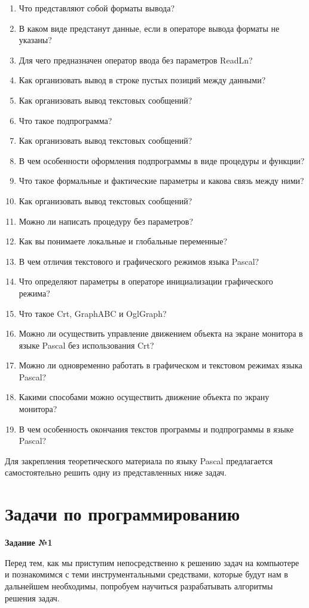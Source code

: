 \begin{enumerate}
\item Что представляют собой форматы вывода?
\item В каком виде предстанут данные, если в операторе вывода форматы не указаны?
\item Для чего предназначен оператор ввода без параметров ReadLn?
\item Как организовать вывод в строке пустых позиций между данными?
\item Как организовать вывод текстовых сообщений?
\item Что такое подпрограмма?
\item Как организовать вывод текстовых сообщений?
\item В чем особенности оформления подпрограммы в виде про­цедуры и функции?
\item Что такое формальные и фактические параметры и какова связь между ними?
\item Как организовать вывод текстовых сообщений?
\item Можно ли написать процедуру без параметров?
\item Как вы понимаете локальные и глобальные переменные?
\item В чем отличия текстового и графического режимов языка Pascal?
\item Что определяют параметры в операторе инициализации гра­фического режима?
\item Что такое Crt, GraphABC и OglGraph?
\item Можно ли осуществить управление движением объекта на экране монитора в языке Pascal без использования Crt?
\item Можно ли одновременно работать в графическом и текстовом режимах языка Pascal?
\item Какими способами можно осуществить движение объекта по экрану монитора?
\item В чем особенность окончания текстов программы и подпрограммы в языке Pascal?
\end{enumerate}

Для закрепления теоретического материала по языку Pascal предлагается самостоятельно решить одну из представленных ниже задач.

\section{Задачи по программированию}

{\bf Задание №1}

Перед тем, как мы приступим непосредственно к решению задач на компьютере и познакомимся с теми инструментальными средствами, которые будут нам в дальнейшем необходимы, попро­буем научиться разрабатывать алгоритмы решения задач.


